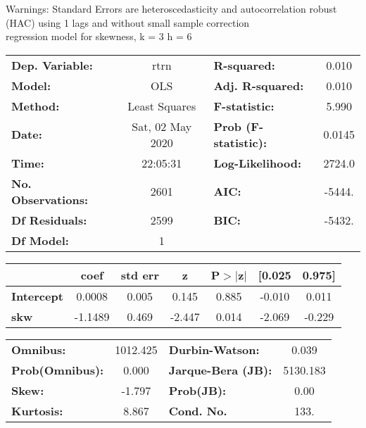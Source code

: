 Warnings: \newline
 [1] Standard Errors are heteroscedasticity and autocorrelation robust (HAC) using 1 lags and without small sample correction\\ 

regression model for skewness, k = 3 h = 6\begin{center}
\begin{tabular}{lclc}
\toprule
\textbf{Dep. Variable:}    &       rtrn       & \textbf{  R-squared:         } &     0.010   \\
\textbf{Model:}            &       OLS        & \textbf{  Adj. R-squared:    } &     0.010   \\
\textbf{Method:}           &  Least Squares   & \textbf{  F-statistic:       } &     5.990   \\
\textbf{Date:}             & Sat, 02 May 2020 & \textbf{  Prob (F-statistic):} &   0.0145    \\
\textbf{Time:}             &     22:05:31     & \textbf{  Log-Likelihood:    } &    2724.0   \\
\textbf{No. Observations:} &        2601      & \textbf{  AIC:               } &    -5444.   \\
\textbf{Df Residuals:}     &        2599      & \textbf{  BIC:               } &    -5432.   \\
\textbf{Df Model:}         &           1      & \textbf{                     } &             \\
\bottomrule
\end{tabular}
\begin{tabular}{lcccccc}
                   & \textbf{coef} & \textbf{std err} & \textbf{z} & \textbf{P$> |$z$|$} & \textbf{[0.025} & \textbf{0.975]}  \\
\midrule
\textbf{Intercept} &       0.0008  &        0.005     &     0.145  &         0.885        &       -0.010    &        0.011     \\
\textbf{skw}       &      -1.1489  &        0.469     &    -2.447  &         0.014        &       -2.069    &       -0.229     \\
\bottomrule
\end{tabular}
\begin{tabular}{lclc}
\textbf{Omnibus:}       & 1012.425 & \textbf{  Durbin-Watson:     } &    0.039  \\
\textbf{Prob(Omnibus):} &   0.000  & \textbf{  Jarque-Bera (JB):  } & 5130.183  \\
\textbf{Skew:}          &  -1.797  & \textbf{  Prob(JB):          } &     0.00  \\
\textbf{Kurtosis:}      &   8.867  & \textbf{  Cond. No.          } &     133.  \\
\bottomrule
\end{tabular}
\end{center}

